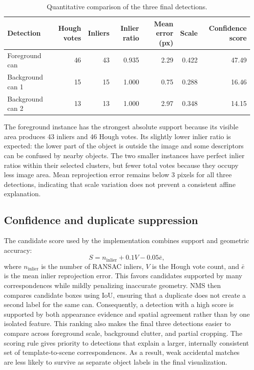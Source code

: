 \documentclass[10pt,twocolumn]{article}
\begin{document}
\begin{table}[t]
\centering
\caption{Quantitative comparison of the three final detections.}
\label{tab:instance-comparison}
\small
\begin{tabular}{lrrrrrr}
\toprule
Detection & Hough votes & Inliers & Inlier ratio & Mean error (px) & Scale & Confidence score\\
\midrule
Foreground can & 46 & 43 & 0.935 & 2.29 & 0.422 & 47.49\\
Background can 1 & 15 & 15 & 1.000 & 0.75 & 0.288 & 16.46\\
Background can 2 & 13 & 13 & 1.000 & 2.97 & 0.348 & 14.15\\
\bottomrule
\end{tabular}
\end{table}

The foreground instance has the strongest absolute support because its visible area produces 43 inliers and 46 Hough votes. Its slightly lower inlier ratio is expected: the lower part of the object is outside the image and some descriptors can be confused by nearby objects. The two smaller instances have perfect inlier ratios within their selected clusters, but fewer total votes because they occupy less image area. Mean reprojection error remains below 3 pixels for all three detections, indicating that scale variation does not prevent a consistent affine explanation.

\subsection{Confidence and duplicate suppression}
The candidate score used by the implementation combines support and geometric accuracy:
\begin{equation}
 S=n_{\mathrm{inlier}}+0.1V-0.05\bar{e},
\end{equation}
where $n_{\mathrm{inlier}}$ is the number of RANSAC inliers, $V$ is the Hough vote count, and $\bar{e}$ is the mean inlier reprojection error. This favors candidates supported by many correspondences while mildly penalizing inaccurate geometry. NMS then compares candidate boxes using IoU, ensuring that a duplicate does not create a second label for the same can.
Consequently, a detection with a high score is supported by both appearance evidence and spatial agreement rather than by one isolated feature.
This ranking also makes the final three detections easier to compare across foreground scale, background clutter, and partial cropping.
The scoring rule gives priority to detections that explain a larger, internally consistent set of template-to-scene correspondences.
As a result, weak accidental matches are less likely to survive as separate object labels in the final visualization.
\end{document}
